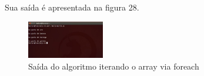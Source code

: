 Sua sa\'ida \'e apresentada na figura 28.


\begin{figure}[!htb]
	\centering
	\includegraphics[width=0.3\textwidth]{../5_figuras/image28}
	\caption{Sa\'ida do algoritmo iterando o array via foreach}
\end{figure}
